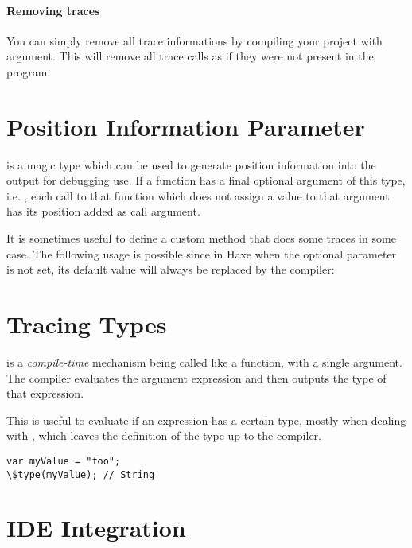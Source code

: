 \paragraph{Removing traces}

You can simply remove all trace informations by compiling your project with  argument. This will remove all trace calls as if they were not present in the program.

\section{Position Information Parameter}
\label{debugging-posinfos}

\href{http://api.haxe.org/haxe/PosInfos.html}{} is a magic type which can be used to generate position information into the output for debugging use.
If a function has a final optional argument of this type, i.e. , each call to that function which does not assign a value to that argument has its position added as call argument. 

It is sometimes useful to define a custom method that does some traces in some case. The following usage is possible since in Haxe when the  optional parameter is not set, its default value will always be replaced by the compiler:


\section{Tracing Types}
\label{debugging-type-function}

 is a \emph{compile-time} mechanism being called like a function, with a single argument. The compiler evaluates the argument expression and then outputs the type of that expression.

This is useful to evaluate if an expression has a certain type, mostly when dealing with , which leaves the definition of the type up to the compiler.

\begin{lstlisting}
var myValue = "foo";
\$type(myValue); // String
\end{lstlisting}


\section{IDE Integration}
\label{debugging-ide-integration}

